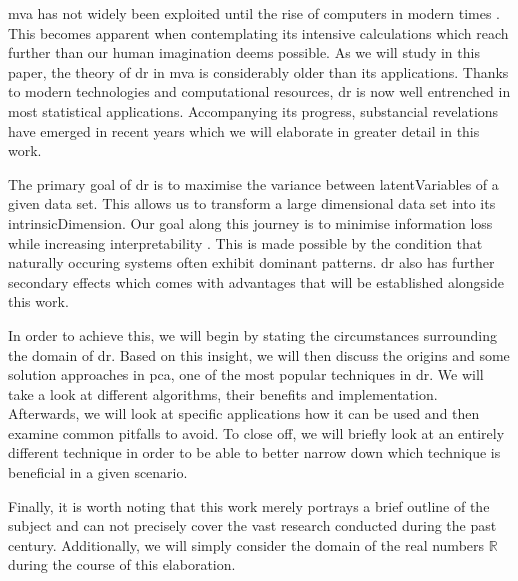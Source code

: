 \Gls{mva} has not widely been exploited until the rise of computers in modern times \cite{Jolliffe2002book}.
This becomes apparent when contemplating its intensive calculations which reach further than our human imagination deems possible.
As we will study in this paper, the theory of \gls{dr} in \gls{mva} is considerably older than its applications.
Thanks to modern technologies and computational resources, \gls{dr} is now well entrenched in most statistical applications.
Accompanying its progress, substancial revelations have emerged in recent years which we will elaborate in greater detail in this work.
\bigskip


The primary goal of \gls{dr} is to maximise the variance between \glspl{latentVariable} of a given data set.
This allows us to transform a large dimensional data set into its \gls{intrinsicDimension}.
Our goal along this journey is to minimise information loss while increasing interpretability \cite{jolliffe2016principal}.
This is made possible by the condition that naturally occuring systems often exhibit dominant patterns.
\Gls{dr} also has further secondary effects which comes with advantages that will be established alongside this work.
\medskip

In order to achieve this, we will begin by stating the circumstances surrounding the domain of \gls{dr}.
Based on this insight, we will then discuss the origins and some solution approaches in \gls{pca}, one of the most popular techniques in \gls{dr}.
We will take a look at different algorithms, their benefits and implementation.
Afterwards, we will look at specific applications how it can be used and then examine common pitfalls to avoid.
To close off, we will briefly look at an entirely different technique in order to be able to better narrow down which technique is beneficial in a given scenario.
\bigskip


Finally, it is worth noting that this work merely portrays a brief outline of the subject and can not precisely cover the vast research conducted during the past century.
Additionally, we will simply consider the domain of the real numbers $\mathbb{R}$ during the course of this elaboration.


